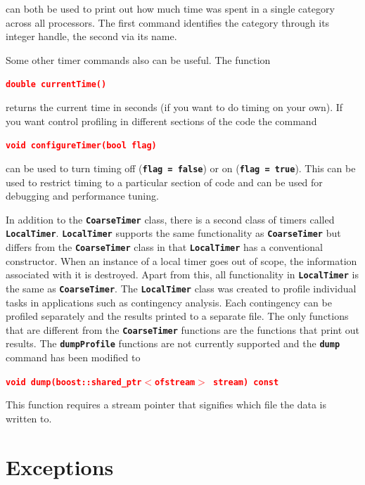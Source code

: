 \documentclass[12pt]{report} %
\begin{document}
can both be used to print out how much time was spent in a single category across all processors. The first command identifies the category through its integer handle, the second via its name.

Some other timer commands also can be useful. The function

\textcolor{red}{\texttt{\textbf{double currentTime()}}}

returns the current time in seconds (if you want to do timing on your own). If you want control profiling in different sections of the code the command

\textcolor{red}{\texttt{\textbf{void configureTimer(bool flag)}}}

can be used to turn timing off (\texttt{\textbf{flag = false}}) or on (\texttt{\textbf{flag = true}}). This can be used to restrict timing to a particular section of code and can be used for debugging and performance tuning.

In addition to the \texttt{\textbf{CoarseTimer}} class, there is a second class of timers called \texttt{\textbf{LocalTimer}}. \texttt{\textbf{LocalTimer}} supports the same functionality as \texttt{\textbf{CoarseTimer}} but differs from the \texttt{\textbf{CoarseTimer}} class in that \texttt{\textbf{LocalTimer}} has a conventional constructor. When an instance of a local timer goes out of scope, the information associated with it is destroyed. Apart from this, all functionality in \texttt{\textbf{LocalTimer}} is the same as \texttt{\textbf{CoarseTimer}}. The \texttt{\textbf{LocalTimer}} class was created to profile individual tasks in applications such as contingency analysis. Each contingency can be profiled separately and the results printed to a separate file. The only functions that are different from the \texttt{\textbf{CoarseTimer}} functions are the functions that print out results. The \texttt{\textbf{dumpProfile}} functions are not currently supported and the \texttt{\textbf{dump}} command has been modified to

\textcolor{red}{\texttt{\textbf{void dump(boost::shared\_ptr$\boldsymbol{\mathrm{<}}$ofstream$\boldsymbol{\mathrm{>}}$ stream) const}}}

This function requires a stream pointer that signifies which file the data is written to.

\section{Exceptions}
\end{document}
